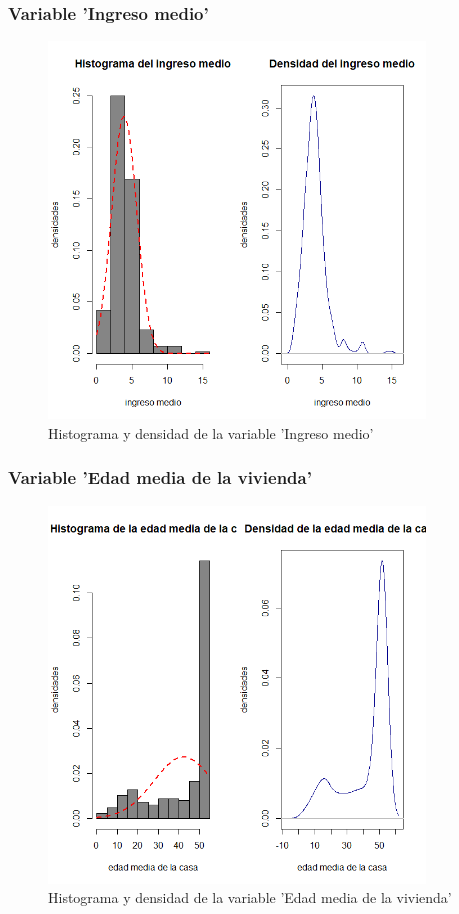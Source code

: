 \documentclass[12pt]{beamer}
\begin{document}
\begin{frame}
\frametitle{Variable 'Ingreso medio'}
\begin{figure}[!h]
    \begin{center}
        \includegraphics[width=10cm]{imagenes/2.png}
        \caption{Histograma y densidad de la variable 'Ingreso medio'}
        \label{fig:Densidad}
    \end{center}
\end{figure}
\end{frame}

\begin{frame}
\frametitle{Variable 'Edad media de la vivienda'}
\begin{figure}[!h]
    \begin{center}
        \includegraphics[width=10cm]{imagenes/3.png}
        \caption{Histograma y densidad de la variable 'Edad media de la vivienda'}
        \label{fig:Densidad}
    \end{center}
\end{figure}
\end{frame}
\end{document}
